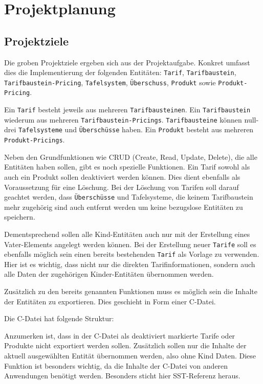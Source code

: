 \chapter{Projektplanung}
\section{Projektziele}
Die groben Projektziele ergeben sich aus der Projektaufgabe. Konkret umfasst dies die Implementierung der folgenden Entitäten:
\texttt{Tarif}, \texttt{Tarifbaustein}, \texttt{Tarif\-baustein-Pricing}, \texttt{Tafelsystem}, \texttt{Überschuss}, \texttt{Produkt} sowie \texttt{Produkt-Pricing}.

Ein \texttt{Tarif} besteht jeweils aus mehreren \texttt{Tarifbausteinen}. Ein \texttt{Tarifbaustein} wiederum aus mehreren \texttt{Tarifbaustein-Pricings}. \texttt{Tarifbausteine} können null-drei \texttt{Tafelsysteme} und \texttt{Überschüsse} haben.
Ein \texttt{Produkt} besteht aus mehreren \texttt{Produkt-Pricings}. 

Neben den Grundfunktionen wie CRUD (Create, Read, Update, Delete), die alle Entitäten haben sollen, gibt es noch spezielle Funktionen.
Ein Tarif sowohl als auch ein Produkt sollen deaktiviert werden können. Dies dient ebenfalls als Voraussetzung für eine Löschung. Bei der Löschung von Tarifen soll darauf geachtet werden, dass \texttt{Überschüsse} und
Tafelsysteme, die keinem Tarifbaustein mehr zugehörig sind auch entfernt werden um keine bezugslose Entitäten zu speichern. 

Dementsprechend sollen alle Kind-Entitäten auch nur mit der Erstellung eines Vater-Elements angelegt werden können.
Bei der Erstellung neuer \texttt{Tarife} soll es ebenfalls möglich sein einen bereits bestehenden \texttt{Tarif} als Vorlage zu verwenden. Hier ist es wichtig, dass nicht nur die direkten Tarifinformationen, 
sondern auch alle Daten der zugehörigen Kinder-Entitäten übernommen werden.

Zusätzlich zu den bereits genannten Funktionen muss es möglich sein 
die Inhalte der Entitäten zu exportieren. Dies geschieht in Form einer C-Datei. 

Die C-Datei hat folgende Struktur: 

Anzumerken ist, dass in der C-Datei als deaktiviert markierte Tarife oder Produkte nicht exportiert werden sollen. Zusätzlich sollen nur die Inhalte der aktuell ausgewählten Entität übernommen werden, also ohne Kind Daten.
Diese Funktion ist besonders wichtig, da die Inhalte der C-Datei von anderen Anwendungen benötigt werden. Besonders sticht hier SST-Referenz heraus.

